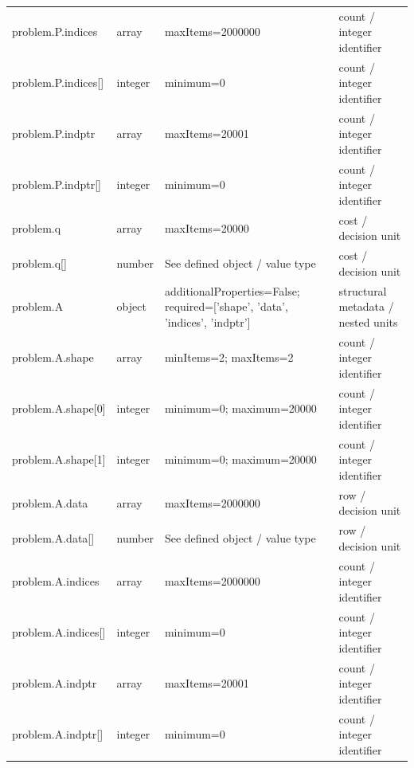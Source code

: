 \begin{longtable}{@{}>{\raggedright\arraybackslash}p{}>{\raggedright\arraybackslash}p{}>{\raggedright\arraybackslash}p{}>{\raggedright\arraybackslash}p{}@{}}
problem.\allowbreak{}P.\allowbreak{}indices & array & maxItems=\allowbreak{}2000000 & count /\allowbreak{} integer identifier\\
problem.\allowbreak{}P.\allowbreak{}indices[] & integer & minimum=\allowbreak{}0 & count /\allowbreak{} integer identifier\\
problem.\allowbreak{}P.\allowbreak{}indptr & array & maxItems=\allowbreak{}20001 & count /\allowbreak{} integer identifier\\
problem.\allowbreak{}P.\allowbreak{}indptr[] & integer & minimum=\allowbreak{}0 & count /\allowbreak{} integer identifier\\
problem.\allowbreak{}q & array & maxItems=\allowbreak{}20000 & cost /\allowbreak{} decision unit\\
problem.\allowbreak{}q[] & number & See defined object /\allowbreak{} value type & cost /\allowbreak{} decision unit\\
problem.\allowbreak{}A & object & additionalProperties=\allowbreak{}False; required=\allowbreak{}['shape', 'data', 'indices', 'indptr'] & structural metadata /\allowbreak{} nested units\\
problem.\allowbreak{}A.\allowbreak{}shape & array & minItems=\allowbreak{}2; maxItems=\allowbreak{}2 & count /\allowbreak{} integer identifier\\
problem.\allowbreak{}A.\allowbreak{}shape[0] & integer & minimum=\allowbreak{}0; maximum=\allowbreak{}20000 & count /\allowbreak{} integer identifier\\
problem.\allowbreak{}A.\allowbreak{}shape[1] & integer & minimum=\allowbreak{}0; maximum=\allowbreak{}20000 & count /\allowbreak{} integer identifier\\
problem.\allowbreak{}A.\allowbreak{}data & array & maxItems=\allowbreak{}2000000 & row /\allowbreak{} decision unit\\
problem.\allowbreak{}A.\allowbreak{}data[] & number & See defined object /\allowbreak{} value type & row /\allowbreak{} decision unit\\
problem.\allowbreak{}A.\allowbreak{}indices & array & maxItems=\allowbreak{}2000000 & count /\allowbreak{} integer identifier\\
problem.\allowbreak{}A.\allowbreak{}indices[] & integer & minimum=\allowbreak{}0 & count /\allowbreak{} integer identifier\\
problem.\allowbreak{}A.\allowbreak{}indptr & array & maxItems=\allowbreak{}20001 & count /\allowbreak{} integer identifier\\
problem.\allowbreak{}A.\allowbreak{}indptr[] & integer & minimum=\allowbreak{}0 & count /\allowbreak{} integer identifier\\

\end{longtable}
